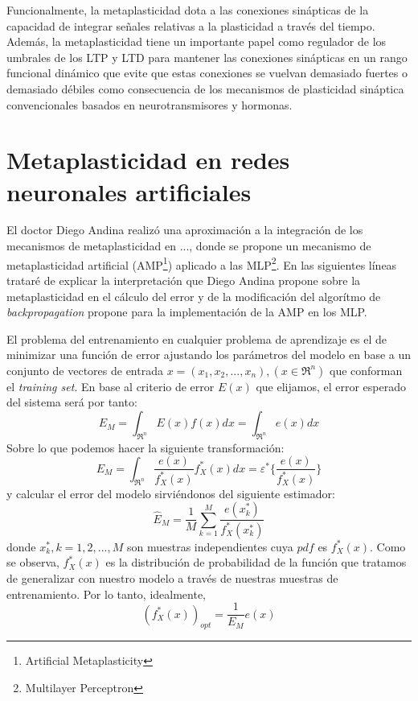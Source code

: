 \documentclass[10pt,a4paper]{report}
\begin{document}
Funcionalmente, la metaplasticidad dota a las conexiones sinápticas de la capacidad de integrar señales relativas a la plasticidad a través del tiempo. Además, la metaplasticidad tiene un importante papel como regulador de los umbrales de los LTP y LTD para mantener las conexiones sinápticas en un rango funcional dinámico que evite que estas conexiones se vuelvan demasiado fuertes o demasiado débiles como consecuencia de los mecanismos de plasticidad sináptica convencionales basados en neurotransmisores y hormonas.

\section{Metaplasticidad en redes neuronales artificiales}
El doctor Diego Andina realizó una aproximación a la integración de los mecanismos de metaplasticidad en ..., donde se propone un mecanismo de metaplasticidad artificial (AMP\footnote{Artificial Metaplasticity}) aplicado a las MLP\footnote{Multilayer Perceptron}. En las siguientes líneas trataré de explicar la interpretación que Diego Andina propone sobre la metaplasticidad en el cálculo del error y de la modificación del algorítmo de \textit{backpropagation} propone para la implementación de la AMP en los MLP.

El problema del entrenamiento en cualquier problema de aprendizaje es el de minimizar una función de error ajustando los parámetros del modelo en base a un conjunto de vectores de entrada $x=(x_1,x_2,...,x_n),(x\in\Re^n)$ que conforman el \textit{training set}. En base al criterio de error $E(x)$ que elijamos, el error esperado del sistema será por tanto:
\begin{equation}
	E_M = \int_{\Re^n}E(x)f(x)dx = \int_{\Re^n}e(x)dx
\end{equation} 
Sobre lo que podemos hacer la siguiente transformación:
\begin{equation}
	\label{metaSub1}
	E_M = \int_{\Re^n}\dfrac{e(x)}{f^*_X(x)}f^*_X(x)dx = \varepsilon^*\lbrace\dfrac{e(x)}{f^*_X(x)}\rbrace
\end{equation}
y calcular el error del modelo sirviéndonos del siguiente estimador:
\begin{equation}
	\label{metaSub2}
	\widehat{E}_M=\dfrac{1}{M}\sum^M_{k=1}\dfrac{e(x^*_k)}{f^*_X(x^*_k)}
\end{equation}
donde $x^*_k,k=1,2,...,M$ son muestras independientes cuya $pdf$ es $f^*_X(x)$. Como se observa, $f^*_X(x)$ es la distribución de probabilidad de la función que tratamos de generalizar con nuestro modelo a través de nuestras muestras de entrenamiento. Por lo tanto, idealmente, 
\begin{equation}
	\label{metaSub3}
	(f^*_X(x))_{opt}=\dfrac{1}{E_M}e(x)
\end{equation}
\end{document}
